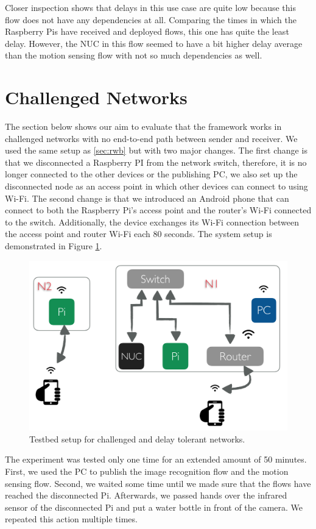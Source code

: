 \noindent Closer inspection shows that  delays in this use case are quite low because this flow does not have any dependencies at all. Comparing the times in which the Raspberry Pis have received and deployed flows, this one  has quite the least delay. However, the NUC in this flow seemed to have a bit higher delay average than the motion sensing flow with not so much dependencies as well.


\section{Challenged Networks}
The section below shows our aim to evaluate that the framework works in challenged networks with no end-to-end path between  sender and receiver. We used the same setup as \ref{sec:rwb} but with two major changes. The first change is that we disconnected  a Raspberry PI from the network switch, therefore, it is no longer connected to the other devices or the publishing PC, we also set up the disconnected node as an access point in which other devices can connect to using Wi-Fi. The second change is that we introduced an Android phone that can connect to both the Raspberry Pi's access point and the router's Wi-Fi connected to the switch. Additionally, the device exchanges  its Wi-Fi connection between the access point and router Wi-Fi each 80 seconds. The system setup is demonstrated in Figure \ref{fig:tb-dtn}.
\begin{figure}[H]
	\centering
	\includegraphics[scale=0.6]{images/tb-dtn.png}
	\caption{Testbed setup for challenged and delay tolerant networks.}
	\label{fig:tb-dtn}
\end{figure} 

\noindent The experiment was tested only one time for an extended amount of 50 minutes. First, we used the PC to publish the image recognition flow and the motion sensing flow. Second, we waited some time until we made sure that the flows have reached the disconnected Pi. Afterwards, we passed hands over the infrared sensor of the disconnected Pi and put a water bottle in front of the camera. We repeated this action multiple times.\\

